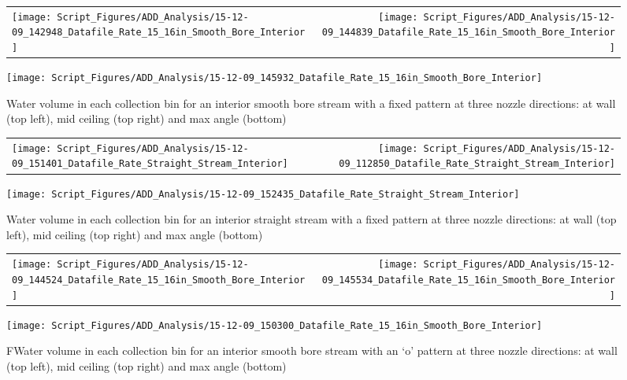 \documentclass{book}
\begin{document}
\begin{figure}[ht]
\begin{tabular*}{\textwidth}{lr}
\texttt{[image: Script\_Figures/ADD\_Analysis/15-12-09\_142948\_Datafile\_Rate\_15\_16in\_Smooth\_Bore\_Interior]} &
\texttt{[image: Script\_Figures/ADD\_Analysis/15-12-09\_144839\_Datafile\_Rate\_15\_16in\_Smooth\_Bore\_Interior]} \\
\end{tabular*}
\centering
\texttt{[image: Script\_Figures/ADD\_Analysis/15-12-09\_145932\_Datafile\_Rate\_15\_16in\_Smooth\_Bore\_Interior]}
\caption{Water volume in each collection bin for an interior smooth bore stream with a fixed pattern at three nozzle directions: at wall (top left), mid ceiling (top right) and max angle (bottom)}
\label{fig:Interior_Varying_Nozzle_Direction_SB_Fixed_Pattern}
\end{figure}

\begin{figure}[ht]
\begin{tabular*}{\textwidth}{lr}
\texttt{[image: Script\_Figures/ADD\_Analysis/15-12-09\_151401\_Datafile\_Rate\_Straight\_Stream\_Interior]} &
\texttt{[image: Script\_Figures/ADD\_Analysis/15-12-09\_112850\_Datafile\_Rate\_Straight\_Stream\_Interior]} \\
\end{tabular*}
\centering
\texttt{[image: Script\_Figures/ADD\_Analysis/15-12-09\_152435\_Datafile\_Rate\_Straight\_Stream\_Interior]}
\caption{Water volume in each collection bin for an interior straight stream with a fixed pattern at three nozzle directions: at wall (top left), mid ceiling (top right) and max angle (bottom)}
\label{fig:Interior_Varying_Nozzle_Direction_SS_Fixed_Pattern}
\end{figure}

\begin{figure}[ht]
\begin{tabular*}{\textwidth}{lr}
\texttt{[image: Script\_Figures/ADD\_Analysis/15-12-09\_144524\_Datafile\_Rate\_15\_16in\_Smooth\_Bore\_Interior]} &
\texttt{[image: Script\_Figures/ADD\_Analysis/15-12-09\_145534\_Datafile\_Rate\_15\_16in\_Smooth\_Bore\_Interior]} \\
\end{tabular*}
\centering
\texttt{[image: Script\_Figures/ADD\_Analysis/15-12-09\_150300\_Datafile\_Rate\_15\_16in\_Smooth\_Bore\_Interior]}
\caption{FWater volume in each collection bin for an interior smooth bore stream with an `o' pattern at three nozzle directions: at wall (top left), mid ceiling (top right) and max angle (bottom)}
\label{fig:Interior_Varying_Nozzle_Direction_SB_O_Pattern}
\end{figure}
\end{document}
